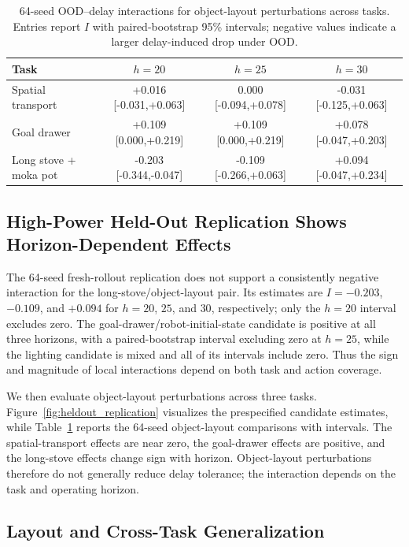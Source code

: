 \documentclass{article}
\begin{document}
\begin{table}[t]
\centering
\small
\caption{64-seed OOD--delay interactions for object-layout perturbations across tasks. Entries report \(I\) with paired-bootstrap 95\% intervals; negative values indicate a larger delay-induced drop under OOD.}
\label{tab:cross_task_object}
\begin{tabular}{l|ccc}
\hline
Task & \(h=20\) & \(h=25\) & \(h=30\) \\
\hline
Spatial transport & +0.016 [-0.031,+0.063] & 0.000 [-0.094,+0.078] & -0.031 [-0.125,+0.063] \\
Goal drawer & +0.109 [0.000,+0.219] & +0.109 [0.000,+0.219] & +0.078 [-0.047,+0.203] \\
Long stove + moka pot & -0.203 [-0.344,-0.047] & -0.109 [-0.266,+0.063] & +0.094 [-0.047,+0.234] \\
\hline
\end{tabular}
\end{table}

\subsection{High-Power Held-Out Replication Shows Horizon-Dependent Effects}

The 64-seed fresh-rollout replication does not support a consistently negative interaction for the long-stove/object-layout pair. Its estimates are \(I=-0.203\), \(-0.109\), and \(+0.094\) for \(h=20\), \(25\), and \(30\), respectively; only the \(h=20\) interval excludes zero. The goal-drawer/robot-initial-state candidate is positive at all three horizons, with a paired-bootstrap interval excluding zero at \(h=25\), while the lighting candidate is mixed and all of its intervals include zero. Thus the sign and magnitude of local interactions depend on both task and action coverage.

We then evaluate object-layout perturbations across three tasks. Figure~\ref{fig:heldout_replication} visualizes the prespecified candidate estimates, while Table~\ref{tab:cross_task_object} reports the 64-seed object-layout comparisons with intervals. The spatial-transport effects are near zero, the goal-drawer effects are positive, and the long-stove effects change sign with horizon. Object-layout perturbations therefore do not generally reduce delay tolerance; the interaction depends on the task and operating horizon.

\subsection{Layout and Cross-Task Generalization}
\end{document}
